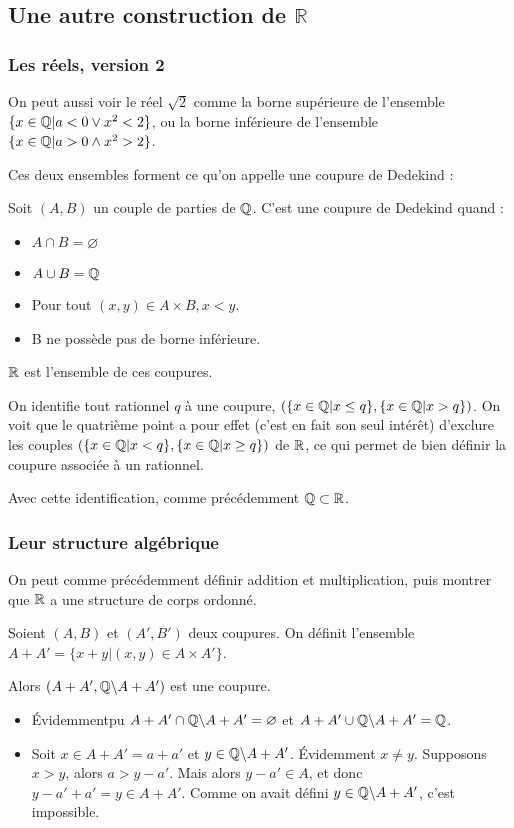 \subsection{Une autre construction de $\mathbb{R}$}
\subsubsection{Les réels, version 2}

On peut aussi voir le réel $\sqrt{2}$ comme la borne supérieure de l'ensemble $\{x\in \mathbb{Q} | a<0 \lor x^2<2\}$, ou la borne inférieure de l'ensemble $\{x\in \mathbb{Q} | a>0 \land x^2>2\}$.

Ces deux ensembles forment ce qu'on appelle une coupure de Dedekind :
\begin{defini}
    Soit $(A, B)$ un couple de parties de $\mathbb{Q}$. C'est une coupure de Dedekind quand :
    \begin{itemize}
        \item $A\cap B = \varnothing$
        \item $A\cup B = \mathbb{Q}$
        \item Pour tout $(x,y) \in A\times B, x<y$.
        \item B ne possède pas de borne inférieure. 
    \end{itemize}
\end{defini}

$\mathbb{R}$ est l'ensemble de ces coupures.

On identifie tout rationnel $q$ à une coupure, $(\{x\in \mathbb{Q} | x \leq q\}, \{x\in \mathbb{Q} | x > q\})$. On voit que le quatrième point a pour effet (c'est en fait son seul intérêt) d'exclure les couples $(\{x\in \mathbb{Q} | x < q\}, \{x\in \mathbb{Q} | x  \geq q\})$ de $\mathbb{R}$, ce qui permet de bien définir la coupure associée à un rationnel.

Avec cette identification, comme précédemment $\mathbb{Q} \subset \mathbb{R}$.

\subsubsection{Leur structure algébrique}

On peut comme précédemment définir addition et multiplication, puis montrer que $\mathbb{R}$ a une structure de corps ordonné.

\begin{defini}[Addition]
    Soient $(A, B)$ et $(A', B')$ deux coupures. On définit l'ensemble $A+A'=\{x+y | (x,y) \in A \times A'\}$.
    
    Alors $(A+A', \mathbb{Q}\backslash A+A')$ est une coupure.
    \tcblower
    \begin{itemize}
        \item Évidemmentpu $A+A'\cap \mathbb{Q}\backslash A+A'=\varnothing$ et $A+A'\cup \mathbb{Q}\backslash A+A'=\mathbb{Q}$.
        \item Soit $x\in A+A'=a+a'$ et $y\in\mathbb{Q}\backslash A+A'$. Évidemment $x\neq y$. Supposons $x>y$, alors $a>y-a'$. Mais alors $y-a' \in A$, et donc $y-a'+a'=y\in A+A'$. Comme on avait défini $y\in\mathbb{Q}\backslash A+A'$, c'est impossible.
    \end{itemize}
\end{defini}

